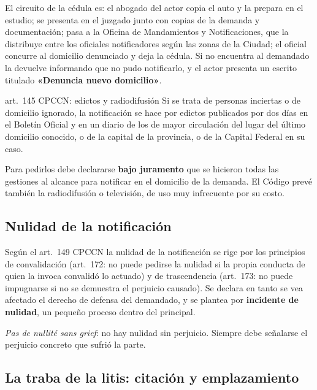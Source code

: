 \documentclass[12pt,oneside]{book}
\begin{document}
El circuito de la cédula es: el abogado del actor copia el auto y la prepara en el estudio; se presenta en el juzgado junto con copias de la demanda y documentación; pasa a la Oficina de Mandamientos y Notificaciones, que la distribuye entre los oficiales notificadores según las zonas de la Ciudad; el oficial concurre al domicilio denunciado y deja la cédula. Si no encuentra al demandado la devuelve informando que no pudo notificarlo, y el actor presenta un escrito titulado \textbf{«Denuncia nuevo domicilio»}.

\begin{norma}{art.~145 CPCCN: edictos y radiodifusión}
Si se trata de personas inciertas o de domicilio ignorado, la notificación se hace por edictos publicados por dos días en el Boletín Oficial y en un diario de los de mayor circulación del lugar del último domicilio conocido, o de la capital de la provincia, o de la Capital Federal en su caso.
\end{norma}

Para pedirlos debe declararse \textbf{bajo juramento} que se hicieron todas las gestiones al alcance para notificar en el domicilio de la demanda. El Código prevé también la radiodifusión o televisión, de uso muy infrecuente por su costo.

\subsection{Nulidad de la notificación}

Según el art.~149 CPCCN la nulidad de la notificación se rige por los principios de convalidación (art.~172: no puede pedirse la nulidad si la propia conducta de quien la invoca convalidó lo actuado) y de trascendencia (art.~173: no puede impugnarse si no se demuestra el perjuicio causado). Se declara en tanto se vea afectado el derecho de defensa del demandado, y se plantea por \textbf{incidente de nulidad}, un pequeño proceso dentro del principal.

\begin{important}
\textit{Pas de nullité sans grief}: no hay nulidad sin perjuicio. Siempre debe señalarse el perjuicio concreto que sufrió la parte.
\end{important}

\subsection{La traba de la litis: citación y emplazamiento}
\end{document}
